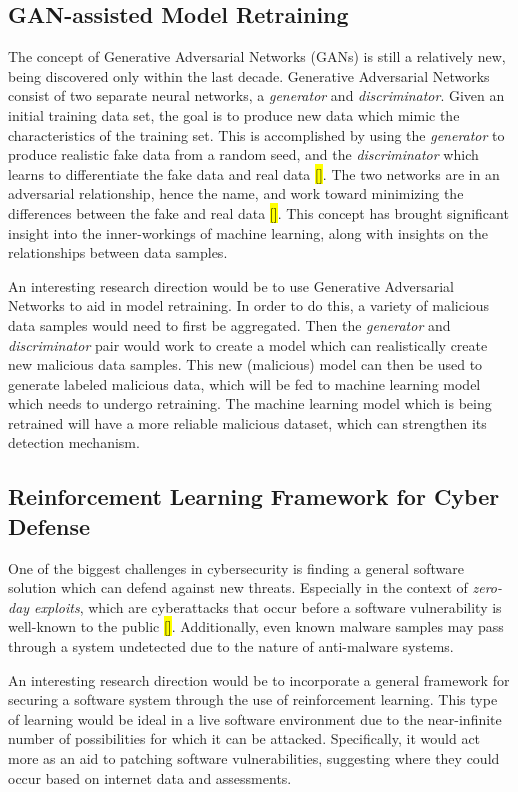 \documentclass[11pt,conference]{IEEEtran}
\begin{document}
\subsection{GAN-assisted Model Retraining}
The concept of Generative Adversarial Networks (GANs) is still a relatively
new, being discovered only within the last decade. Generative Adversarial
Networks consist of two separate neural networks, a \emph{generator}
and \emph{discriminator}. Given an initial training data set, the goal is to
produce new data which mimic the characteristics of the training set. This is
accomplished by using the \emph{generator} to produce realistic fake data from
a random seed, and the \emph{discriminator} which learns to differentiate the
fake data and real data \hl{[]}. The two networks are in an adversarial relationship,
hence the name, and work toward minimizing the differences between the fake and
real data \hl{[]}. This concept has brought significant insight into the inner-workings
of machine learning, along with insights on the relationships between data
samples.

An interesting research direction would be to use Generative Adversarial
Networks to aid in model retraining. In order to do this, a
variety of malicious data samples would need to first be aggregated. Then the
\emph{generator} and \emph{discriminator} pair would work to create a model
which can realistically create new malicious data samples. This new (malicious)
model can then be used to generate labeled malicious data, which will be fed to
machine learning model which needs to undergo retraining. The machine learning
model which is being retrained will have a more reliable malicious dataset,
which can strengthen its detection mechanism.

\subsection{Reinforcement Learning Framework for Cyber Defense}
One of the biggest challenges in cybersecurity is finding a general software
solution which can defend against new threats. Especially in the
context of \emph{zero-day exploits}, which are cyberattacks that occur before a
software vulnerability is well-known to the public \hl{[]}. Additionally, even known
malware samples may pass through a system undetected due to the nature of
anti-malware systems.

An interesting research direction would be to incorporate a general framework
for securing a software system through the use of reinforcement learning. This
type of learning would be ideal in a live software environment due to the
near-infinite number of possibilities for which it can be attacked. Specifically, it
would act more as an aid to patching software vulnerabilities, suggesting where
they could occur based on internet data and assessments.
\end{document}
